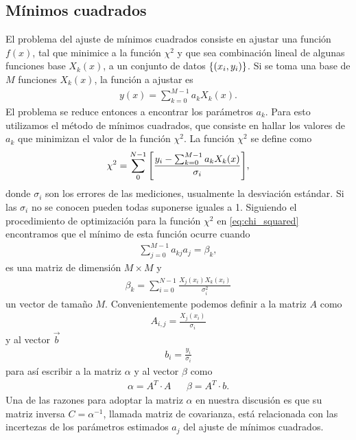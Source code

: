 \documentclass[11pt,letterpaper]{article}
\begin{document}
\subsection{Mínimos cuadrados}
El problema del ajuste de mínimos cuadrados consiste en
ajustar una función $f(x)$, tal que minimice a la función $\chi^2$ y que sea combinación 
lineal de algunas funciones base $X_k(x)$, a un conjunto de datos $\qty{(x_i,y_i)}$.
Si se toma una base de $M$ funciones $X_k(x)$, la función a ajustar es 
\begin{align}
y(x)=\sum_{k=0}^{M-1}a_kX_k(x).
\end{align}
El problema se reduce entonces a encontrar los parámetros $a_k$. Para 
esto utilizamos el método de mínimos cuadrados, que consiste en hallar los
valores de $a_k$ que minimizan el valor de la función $\chi^2$.
La función $\chi^2$ se define como
\begin{align}\label{eq:chi_squared}
\chi^2=\sum_0^{N-1}\qty[\frac{y_i-\sum_{k=0}^{M-1}a_kX_k(x)}{\sigma_i}],
\end{align}
donde $\sigma_i$ son los errores de las mediciones, usualmente la desviación
estándar. Si las $\sigma_i$ no se conocen pueden todas suponerse iguales a 1.
Siguiendo el procedimiento de optimización para la función $\chi^2$ en 
\eqref{eq:chi_squared} encontramos que el mínimo de esta función ocurre cuando
\begin{align}\label{eq:linear:sys:least:squares}
\sum_{j=0}^{M-1}a_{kj}a_j=\beta_k,
\end{align}
es una matriz de dimensión $M\times M$ y 
\begin{align}
\beta_k=\sum_{i=0}^{N-1}\frac{X_j(x_i)X_k(x_i)}{\sigma_i^2}
\end{align} 
un vector de tamaño $M$. Convenientemente podemos definir a la matriz $A$ como
\begin{align}\label{eq:A:def}
A_{i,j}=\frac{X_j(x_i)}{\sigma_i}
\end{align}
y al vector $\vec b$
\begin{align}\label{eq:b:def}
b_i=\frac{y_i}{\sigma_i}
\end{align}
para así escribir a la matriz $\alpha$ y al vector $\beta$ como
\begin{align}\label{eq:alpha:and:beta}
\alpha=A^T\cdot A && \beta=A^T\cdot b.
\end{align}
Una de las razones para adoptar la matriz $\alpha$ en nuestra discusión es que su matriz
inversa $C=\alpha^{-1}$, llamada matriz de covarianza, está relacionada
con las incertezas de los parámetros estimados $a_j$ del ajuste de mínimos 
cuadrados.  
\end{document}
